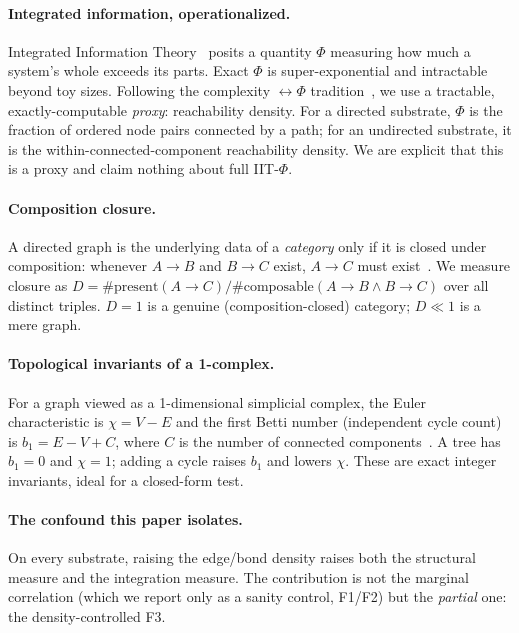\documentclass[11pt,a4paper]{article}
\begin{document}
\paragraph{Integrated information, operationalized.}
Integrated Information Theory~\citep{tononi2004,oizumi2014} posits a quantity
$\Phi$ measuring how much a system's whole exceeds its parts. Exact $\Phi$ is
super-exponential and intractable beyond toy sizes. Following the complexity
$\leftrightarrow\Phi$ tradition~\citep{lempelziv1976}, we use a tractable,
exactly-computable \emph{proxy}: reachability density. For a directed substrate,
$\Phi$ is the fraction of ordered node pairs connected by a path; for an
undirected substrate, it is the within-connected-component reachability density.
We are explicit that this is a proxy and claim nothing about full IIT-$\Phi$.

\paragraph{Composition closure.}
A directed graph is the underlying data of a \emph{category} only if it is closed
under composition: whenever $A\to B$ and $B\to C$ exist, $A\to C$ must
exist~\citep{maclane1971}. We measure closure as
$D = \#\text{present}(A\to C) / \#\text{composable}(A\to B \wedge B\to C)$ over
all distinct triples. $D{=}1$ is a genuine (composition-closed) category;
$D \ll 1$ is a mere graph.

\paragraph{Topological invariants of a 1-complex.}
For a graph viewed as a 1-dimensional simplicial complex, the Euler
characteristic is $\chi = V - E$ and the first Betti number (independent cycle
count) is $b_1 = E - V + C$, where $C$ is the number of connected
components~\citep{hatcher2002}. A tree has $b_1 = 0$ and $\chi = 1$; adding a
cycle raises $b_1$ and lowers $\chi$. These are exact integer invariants, ideal
for a closed-form test.

\paragraph{The confound this paper isolates.}
On every substrate, raising the edge/bond density raises both the structural
measure and the integration measure. The contribution is not the marginal
correlation (which we report only as a sanity control, F1/F2) but the
\emph{partial} one: the density-controlled F3.
\end{document}
